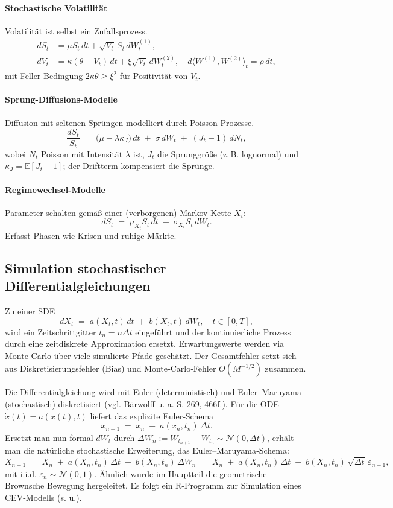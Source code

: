 \paragraph{Stochastische Volatilität}
Volatilität ist selbst ein Zufallsprozess.
$$
\begin{aligned}
dS_t &= \mu S_t\,dt + \sqrt{V_t}\,S_t\,dW_t^{(1)},\\
dV_t &= \kappa(\theta - V_t)\,dt + \xi\sqrt{V_t}\,dW_t^{(2)},\quad d \langle W^{(1)},W^{(2)}\rangle_t=\rho\,dt,
\end{aligned}
$$
mit Feller-Bedingung $2\kappa\theta\ge \xi^2$ für Positivität von $V_t$.

\paragraph{Sprung-Diffusions-Modelle}
Diffusion mit seltenen Sprüngen modelliert durch Poisson-Prozesse.
$$
\frac{dS_t}{S_t} \;=\; \big(\mu - \lambda \kappa_J\big)\,dt \;+\; \sigma\,dW_t \;+\; (J_t-1)\,dN_t,
$$
wobei $N_t$ Poisson mit Intensität $\lambda$ ist, $J_t$ die Sprunggröße (z.\,B. lognormal) und $\kappa_J=\mathbb E[J_t-1]$; der Driftterm kompensiert die Sprünge.

\paragraph{Regimewechsel-Modelle}
Parameter schalten gemäß einer (verborgenen) Markov-Kette $X_t$:
$$
dS_t \;=\; \mu_{X_t} S_t\,dt \;+\; \sigma_{X_t} S_t\,dW_t.
$$
Erfasst Phasen wie Krisen und ruhige Märkte.

\subsection{Simulation stochastischer Differentialgleichungen}
Zu einer SDE
$$
dX_t \;=\; a(X_t,t)\,dt \;+\; b(X_t,t)\,dW_t,\quad t\in[0,T],
$$
wird ein Zeitschrittgitter $t_n=n\Delta t$ eingeführt und der kontinuierliche Prozess durch eine zeitdiskrete Approximation ersetzt. Erwartungswerte werden via Monte‑Carlo über viele simulierte Pfade geschätzt. Der Gesamtfehler setzt sich aus Diskretisierungsfehler (Bias) und Monte‑Carlo‑Fehler $O(M^{-1/2})$ zusammen.

Die Differentialgleichung wird mit Euler (deterministisch) und Euler–Maruyama (stochastisch) diskretisiert (vgl. Bärwolff \cite{Baerwolff2025} u. a. S. 269, 466f.).
Für die ODE $\dot x(t)=a(x(t),t)$ liefert das explizite Euler‑Schema
$$
x_{n+1} \;=\; x_n \;+\; a(x_n,t_n)\,\Delta t.
$$
Ersetzt man nun formal $dW_t$ durch $\Delta W_n:=W_{t_{n+1}}-W_{t_n}\sim \mathcal N(0,\Delta t)$, erhält man die natürliche stochastische Erweiterung, das Euler–Maruyama‑Schema:
$$
X_{n+1} \;=\; X_n \;+\; a(X_n,t_n)\,\Delta t \;+\; b(X_n,t_n)\,\Delta W_n
\;=\; X_n \;+\; a(X_n,t_n)\,\Delta t \;+\; b(X_n,t_n)\,\sqrt{\Delta t}\,\varepsilon_{n+1},
$$
mit i.i.d. $\varepsilon_{n}\sim\mathcal N(0,1)$. 
Ähnlich wurde im Hauptteil die geometrische Brownsche Bewegung hergeleitet.
Es folgt ein R-Programm zur Simulation eines CEV-Modells (s. u.).


